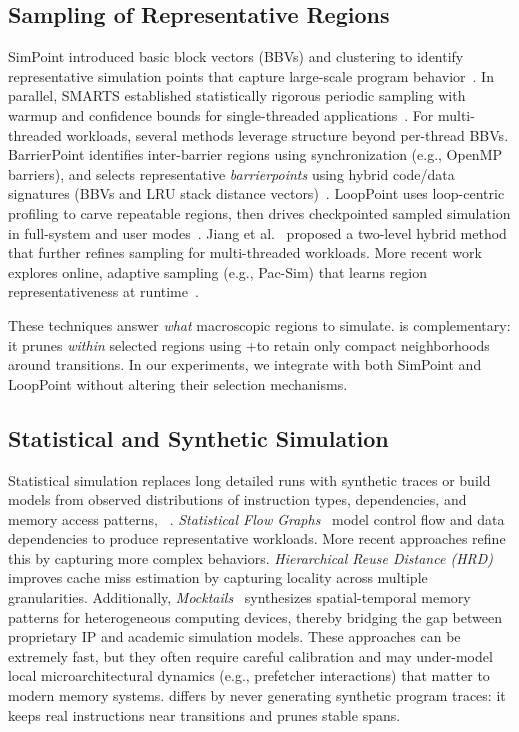 \subsection{Sampling of Representative Regions}
SimPoint introduced basic block vectors (BBVs) and clustering to identify representative simulation points that capture large-scale program behavior~\cite{simpoint-asplos02,hamerly-per04,hamerly-jmlr06}. In parallel, SMARTS established statistically rigorous periodic sampling with warmup and confidence bounds for single-threaded applications~\cite{smarts-isca03}. For multi-threaded workloads, several methods leverage structure beyond per-thread BBVs. BarrierPoint identifies inter-barrier regions using synchronization (e.g., OpenMP barriers), and selects representative \emph{barrierpoints} using hybrid code/data signatures (BBVs and LRU stack distance vectors)~\cite{barrierpoint-ispass14}. LoopPoint uses loop-centric profiling to carve repeatable regions, then drives checkpointed sampled simulation in full-system and user modes~\cite{looppoint-hpca22}. Jiang et al.~\cite{jiang2015_taco} proposed a two-level hybrid method that further refines sampling for multi-threaded workloads. More recent work explores online, adaptive sampling (e.g., Pac-Sim) that learns region representativeness at runtime~\cite{pacsimm-taco24}. 
 
These techniques answer \emph{what} macroscopic regions to simulate. \name is complementary: it prunes \emph{within} selected regions using \pts+\cpd to retain only compact neighborhoods around transitions.
In our experiments, we integrate with both SimPoint and LoopPoint without altering their selection mechanisms.
\subsection{Statistical and Synthetic Simulation}
Statistical simulation replaces long detailed runs with synthetic traces or build models from observed distributions of instruction types, dependencies, and memory access patterns, ~\cite{nussbaum-pact01,controlflow-isca04}. \emph{Statistical Flow Graphs}~\cite{wunderlich2003smarts} model control flow and data dependencies to produce representative workloads. {More recent approaches refine this by capturing more complex behaviors}. \emph{Hierarchical Reuse Distance (HRD)}~\cite{hrd} improves cache miss estimation by capturing locality across multiple granularities. Additionally, \emph{Mocktails}~\cite{mocktails} synthesizes spatial-temporal memory patterns for heterogeneous computing devices, thereby bridging the gap between proprietary IP and academic simulation models.  These approaches can be extremely fast, but they often require careful calibration and may under-model local microarchitectural dynamics (e.g., prefetcher  interactions) that matter to modern memory systems.  
\name differs by never generating synthetic program traces: it keeps real instructions near transitions and prunes stable spans.
